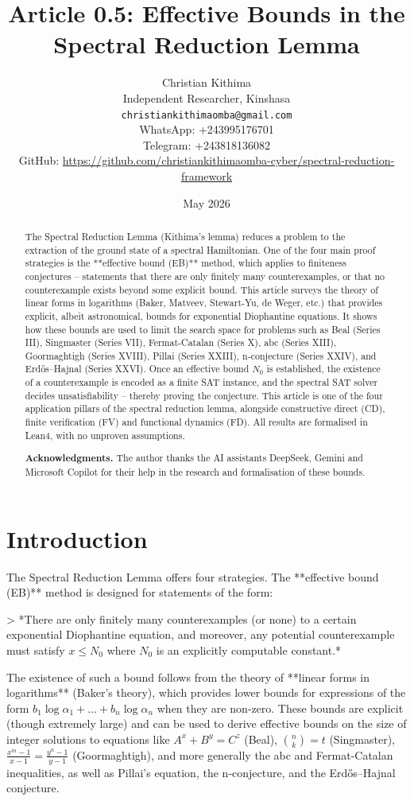 \documentclass[11pt,a4paper]{article}
\title{Article 0.5: Effective Bounds in the Spectral Reduction Lemma}
\author{Christian Kithima \\
Independent Researcher, Kinshasa \\
\texttt{christiankithimaomba@gmail.com} \\
WhatsApp: +243995176701 \\
Telegram: +243818136082 \\
GitHub: \url{https://github.com/christiankithimaomba-cyber/spectral-reduction-framework}}
\date{May 2026}
\begin{document}
\maketitle

\begin{abstract}
The Spectral Reduction Lemma (Kithima's lemma) reduces a problem to the extraction of the ground state of a spectral Hamiltonian. One of the four main proof strategies is the **effective bound (EB)** method, which applies to finiteness conjectures – statements that there are only finitely many counterexamples, or that no counterexample exists beyond some explicit bound. This article surveys the theory of linear forms in logarithms (Baker, Matveev, Stewart‑Yu, de Weger, etc.) that provides explicit, albeit astronomical, bounds for exponential Diophantine equations. It shows how these bounds are used to limit the search space for problems such as Beal (Series III), Singmaster (Series VII), Fermat‑Catalan (Series X), abc (Series XIII), Goormaghtigh (Series XVIII), Pillai (Series XXIII), n‑conjecture (Series XXIV), and Erdős–Hajnal (Series XXVI). Once an effective bound \(N_0\) is established, the existence of a counterexample is encoded as a finite SAT instance, and the spectral SAT solver decides unsatisfiability – thereby proving the conjecture. This article is one of the four application pillars of the spectral reduction lemma, alongside constructive direct (CD), finite verification (FV) and functional dynamics (FD). All results are formalised in Lean4, with no unproven assumptions.

\textbf{Acknowledgments.} The author thanks the AI assistants DeepSeek, Gemini and Microsoft Copilot for their help in the research and formalisation of these bounds.
\end{abstract}

\tableofcontents

\section{Introduction}

The Spectral Reduction Lemma offers four strategies. The **effective bound (EB)** method is designed for statements of the form:

> *There are only finitely many counterexamples (or none) to a certain exponential Diophantine equation, and moreover, any potential counterexample must satisfy \(x \le N_0\) where \(N_0\) is an explicitly computable constant.*

The existence of such a bound follows from the theory of **linear forms in logarithms** (Baker's theory), which provides lower bounds for expressions of the form \(b_1\log\alpha_1 + \dots + b_n\log\alpha_n\) when they are non‑zero. These bounds are explicit (though extremely large) and can be used to derive effective bounds on the size of integer solutions to equations like \(A^x + B^y = C^z\) (Beal), \(\binom{n}{k}=t\) (Singmaster), \(\frac{x^m-1}{x-1} = \frac{y^n-1}{y-1}\) (Goormaghtigh), and more generally the abc and Fermat‑Catalan inequalities, as well as Pillai's equation, the n‑conjecture, and the Erdős–Hajnal conjecture.
\end{document}
